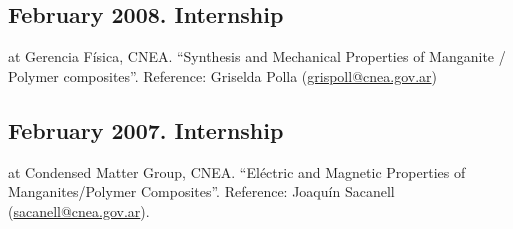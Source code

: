\subsection{February 2008. Internship }at Gerencia Física, CNEA. “Synthesis and Mechanical Properties of Manganite / Polymer composites”. Reference: Griselda Polla (\url{grispoll@cnea.gov.ar})

\subsection{February 2007. Internship} at Condensed Matter Group, CNEA. “Eléctric and Magnetic Properties of Manganites/Polymer Composites”. Reference: Joaquín Sacanell (\url{sacanell@cnea.gov.ar}). 

